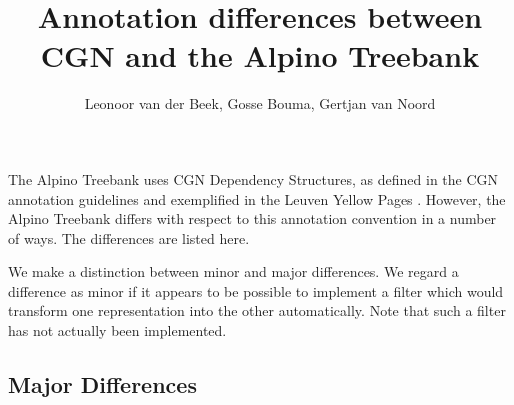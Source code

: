 \documentclass[12pt]{article}
\begin{document}
\title{Annotation differences between CGN and the Alpino Treebank}

\author{Leonoor van der Beek, Gosse Bouma, Gertjan van Noord}

\maketitle

The Alpino Treebank uses CGN Dependency Structures, as defined in the
CGN annotation guidelines \cite{cgn-annot} and exemplified in the
Leuven Yellow Pages \cite{leuven-yellow-pages}. However, the Alpino
Treebank differs with respect to this annotation convention in a
number of ways. The differences are listed here.

We make a distinction between minor and major differences. We regard a
difference as minor if it appears to be possible to implement a filter
which would transform one representation into the other automatically.
Note that such a filter has not actually been implemented.

\subsection*{Major Differences}
\end{document}
